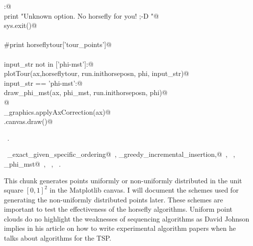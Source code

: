 \documentclass[11.5pt]{report}
\begin{document}
\begin{flushleft}
\begin{list}{}{}
\mbox{}\verb@else:@\\
\mbox{}\verb@      print "Unknown option. No horsefly for you! ;-D "@\\
\mbox{}\verb@      sys.exit()@\\
\mbox{}\verb@@\\
\mbox{}\verb@#print horseflytour['tour_points']@\\
\mbox{}\verb@@\\
\mbox{}\verb@if input_str not in ['phi-mst']:@\\
\mbox{}\verb@     plotTour(ax,horseflytour, run.inithorseposn, phi, input_str)@\\
\mbox{}\verb@elif input_str == 'phi-mst':@\\
\mbox{}\verb@     draw_phi_mst(ax, phi_mst, run.inithorseposn, phi)@\\
\mbox{}\verb@     @\\
\mbox{}\verb@utils_graphics.applyAxCorrection(ax)@\\
\mbox{}\verb@fig.canvas.draw()@\\
\mbox{}\verb@@{\NWsep}
\end{list}
\vspace{-1.5ex}
\footnotesize
\begin{list}{}{\setlength{\itemsep}{-\parsep}\setlength{\itemindent}{-\leftmargin}}
\item \NWtxtMacroRefIn\ .
\item \NWtxtIdentsUsed\nobreak\  \verb@algo_exact_given_specific_ordering@\nobreak\ , \verb@algo_greedy_incremental_insertion,@\nobreak\ , \verb@computeStructure@\nobreak\ , \verb@draw_phi_mst@\nobreak\ , \verb@getTour@\nobreak\ , \verb@plotTour@\nobreak\ .
\item{}
\end{list}
\vspace{4ex}
\end{flushleft}

\vspace{-0.8cm}\newchunk This chunk generates points uniformly or non-uniformly distributed in the 
unit square $[0,1]^2$ in the Matplotlib canvas. I will document the schemes used for 
generating the non-uniformly distributed points later. These schemes are important to test the effectiveness of 
the horsefly algorithms. Uniform point clouds do no highlight the weaknesses of 
sequencing algorithms as David Johnson implies in his article on how to write 
experimental algorithm papers when he talks about algorithms for the TSP. 
\end{document}
